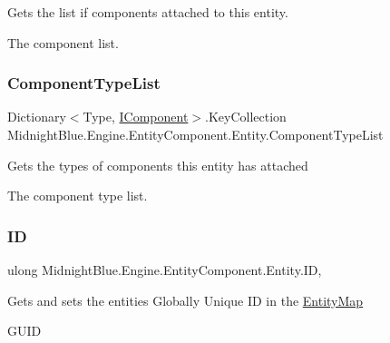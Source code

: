Gets the list if components attached to this entity. 

The component list.\hypertarget{class_midnight_blue_1_1_engine_1_1_entity_component_1_1_entity_abe7bb823ef9a014142978d52487bc683}{}\label{class_midnight_blue_1_1_engine_1_1_entity_component_1_1_entity_abe7bb823ef9a014142978d52487bc683} 
\subsubsection{\texorpdfstring{Component\+Type\+List}{ComponentTypeList}}
{\footnotesize\ttfamily Dictionary$<$Type, \hyperlink{interface_midnight_blue_1_1_engine_1_1_entity_component_1_1_i_component}{I\+Component}$>$.Key\+Collection Midnight\+Blue.\+Engine.\+Entity\+Component.\+Entity.\+Component\+Type\+List\hspace{0.3cm}{\ttfamily [get]}}



Gets the types of components this entity has attached 

The component type list.\hypertarget{class_midnight_blue_1_1_engine_1_1_entity_component_1_1_entity_a25258a0148ffe34bae09190702056014}{}\label{class_midnight_blue_1_1_engine_1_1_entity_component_1_1_entity_a25258a0148ffe34bae09190702056014} 
\subsubsection{\texorpdfstring{ID}{ID}}
{\footnotesize\ttfamily ulong Midnight\+Blue.\+Engine.\+Entity\+Component.\+Entity.\+ID\hspace{0.3cm}{\ttfamily [get]}, {\ttfamily [set]}}



Gets and sets the entities Globally Unique ID in the \hyperlink{class_midnight_blue_1_1_engine_1_1_entity_component_1_1_entity_map}{Entity\+Map} 

G\+U\+ID\hypertarget{class_midnight_blue_1_1_engine_1_1_entity_component_1_1_entity_a1438182478b8e4e0f9ef1ffebc795c10}{}\label{class_midnight_blue_1_1_engine_1_1_entity_component_1_1_entity_a1438182478b8e4e0f9ef1ffebc795c10} 
